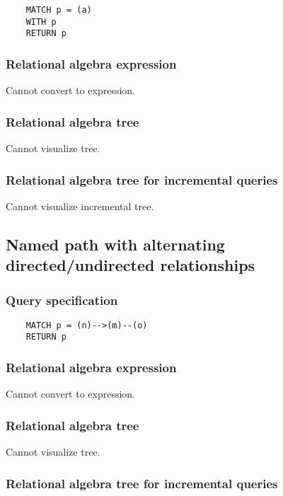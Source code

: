 	\begin{lstlisting}
	MATCH p = (a)
	WITH p
	RETURN p
	\end{lstlisting}


	\subsubsection*{Relational algebra expression}

	Cannot convert to expression.

	\subsubsection*{Relational algebra tree}

	Cannot visualize tree.

	\subsubsection*{Relational algebra tree for incremental queries}

	Cannot visualize incremental tree.
	\subsection{Named path with alternating directed/undirected relationships}

	\subsubsection*{Query specification}

	\begin{lstlisting}
	MATCH p = (n)-->(m)--(o)
	RETURN p
	\end{lstlisting}


	\subsubsection*{Relational algebra expression}

	Cannot convert to expression.

	\subsubsection*{Relational algebra tree}

	Cannot visualize tree.

	\subsubsection*{Relational algebra tree for incremental queries}

